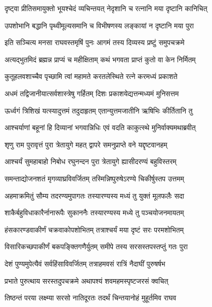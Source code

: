 \twolineshloka
{दृष्ट्वा प्रीतिसमायुक्तो भूयश्चेदं व्यचिन्तयत्}
{नेदृशानि च रत्नानि मया दृष्टानि कानिचित्}%

\twolineshloka
{उपशोभानि बद्धानि पृथ्वीमूल्यसमानि च}
{विभीषणस्य लङ्कायां न दृष्टानि मया पुरा}%

\twolineshloka
{इति सञ्चित्य मनसा राघवस्तमृषिं पुनः}
{आगमं तस्य दिव्यस्य प्रष्टुं समुपचक्रमे}%

\twolineshloka
{अत्यद्भुतमिदं ब्रह्मन्न प्राप्यं च महीक्षिताम्}
{कथं भगवता प्राप्तं कुतो वा केन निर्मितम्}%

\twolineshloka
{कुतूहलवशाच्चैव पृच्छामि त्वां महामते}
{करतलेस्थिते रत्ने करमध्यं प्रकाशते}%

\twolineshloka
{अधमं तद्विजानीयात्सर्वशास्त्रेषु गर्हितम्}
{दिशः प्रकाशयेद्यत्तन्मध्यमं मुनिसत्तम}%

\twolineshloka
{ऊर्ध्वगं त्रिशिखं यत्स्यादुत्तमं तदुदाहृतम्}
{एतान्युत्तमजातीनि ऋषिभिः कीर्तितानि तु}%

\twolineshloka
{आश्चर्याणां बहूनां हि दिव्यानां भगवान्निधिः}
{एवं वदति काकुत्स्थे मुनिर्वाक्यमथाब्रवीत्}%


\twolineshloka
{शृणु राम पुरावृत्तं पुरा त्रेतायुगे महत्}
{द्वापरे समनुप्राप्ते वने यद्दृष्टवानहम्}%

\twolineshloka
{आश्चर्यं सुमहाबाहो निबोध रघुनन्दन}
{पुरा त्रेतायुगे ह्यासीदरण्यं बहुविस्तरम्}%

\twolineshloka
{समन्ताद्योजनशतं मृगव्याघ्रविवर्जितम्}
{तस्मिन्निष्पुरुषेऽरण्ये चिकीर्षुस्तप उत्तमम्}%

\twolineshloka
{अहमाक्रमितुं सौम्य तदरण्यमुपागतः}
{तस्यारण्यस्य मध्यं तु युक्तं मूलफलैः सदा}%

\twolineshloka
{शाकैर्बहुविधाकारैर्नानारूपैः सुकाननैः}
{तस्यारण्यस्य मध्ये तु पञ्चयोजनमायतम्}%

\twolineshloka
{हंसकारण्डवाकीर्णं चक्रवाकोपशोभितम्}
{तत्राश्चर्यं मया दृष्टं सरः परमशोभितम्}%

\twolineshloka
{विसारिकच्छपाकीर्णं बकपङ्क्तिगणैर्युतम्}
{समीपे तस्य सरसस्तपस्तप्तुं गतः पुरा}%

\twolineshloka
{देशं पुण्यमुपेत्यैवं सर्वहिंसाविवर्जितम्}
{तत्राहमवसं रात्रिं नैदाघीं पुरुषर्षभ}%

\twolineshloka
{प्रभाते पुरुत्थाय सरस्तदुपचक्रमे}
{अथापश्यं शवमहमस्पृष्टजरसं क्वचित्}%

\twolineshloka
{तिष्ठन्तं परया लक्ष्म्या सरसो नातिदूरतः}
{तदर्थं चिन्तयानोहं मुहूर्तमिव राघव}%

